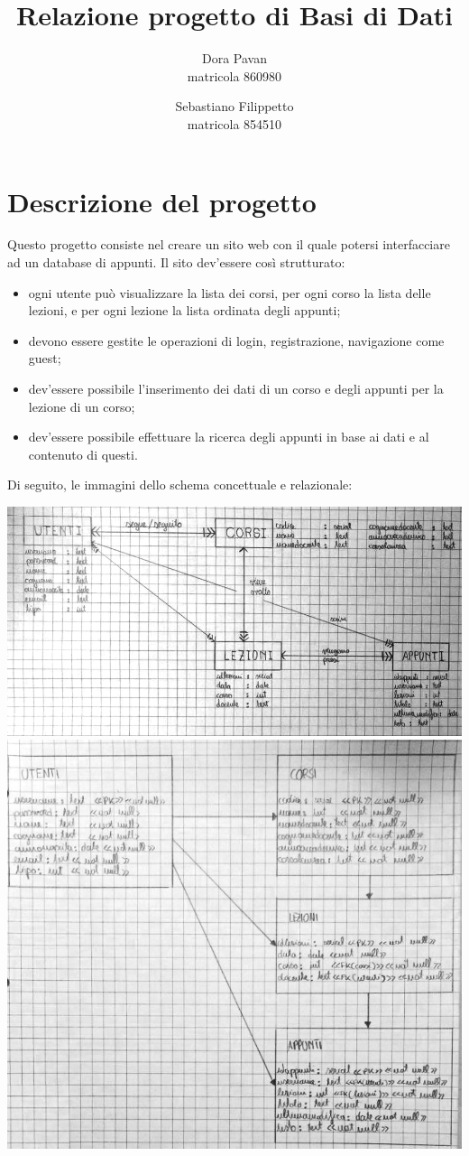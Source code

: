 \documentclass[a4paper]{report}
\title{\Huge{Relazione progetto di Basi di Dati}}
\author{
	Dora Pavan\\
	matricola 860980
	\and
	Sebastiano Filippetto\\
	matricola 854510
}
\begin{document}
\maketitle
\tableofcontents
\newpage
\chapter{Descrizione del progetto}
Questo progetto consiste nel creare un sito web con il quale potersi interfacciare ad un database di appunti. Il sito dev'essere così strutturato:
\begin{itemize}
\item ogni utente può visualizzare la lista dei corsi, per ogni corso la lista delle lezioni, e per ogni lezione la lista ordinata degli appunti;
\item devono essere gestite le operazioni di login, registrazione, navigazione come guest;
\item dev'essere possibile l'inserimento dei dati di un corso e degli appunti per la lezione di un corso;
\item dev'essere possibile effettuare la ricerca degli appunti in base ai dati e al contenuto di questi.
\end{itemize}
Di seguito, le immagini dello schema concettuale e relazionale:\\
\begin{center}
\includegraphics[scale=0.5]{1.jpg}
\includegraphics[scale=0.5]{2.jpg}
\end{center}
\end{document}
